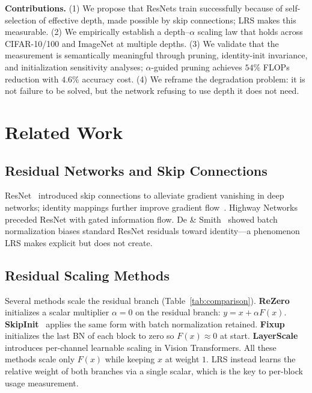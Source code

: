 \documentclass{bmvc2k}
\begin{document}
\textbf{Contributions.}
(1) We propose that ResNets train successfully because of self-selection of effective depth, made possible by skip connections; LRS makes this measurable.
(2) We empirically establish a depth--$\alpha$ scaling law that holds across CIFAR-10/100 and ImageNet at multiple depths.
(3) We validate that the measurement is semantically meaningful through pruning, identity-init invariance, and initialization sensitivity analyses; $\alpha$-guided pruning achieves $54\%$ FLOPs reduction with $4.6\%$ accuracy cost.
(4) We reframe the degradation problem: it is not failure to be solved, but the network refusing to use depth it does not need.

\section{Related Work}
\label{sec:related}

\subsection{Residual Networks and Skip Connections}

ResNet~\cite{he2016deep} introduced skip connections to alleviate gradient vanishing in deep networks; identity mappings further improve gradient flow~\cite{he2016identity}. Highway Networks~\cite{srivastava2015highway} preceded ResNet with gated information flow. De \& Smith~\cite{de2020batch} showed batch normalization biases standard ResNet residuals toward identity---a phenomenon LRS makes explicit but does not create.

\subsection{Residual Scaling Methods}

Several methods scale the residual branch (Table~\ref{tab:comparison}). \textbf{ReZero}~\cite{bachlechner2021rezero} initializes a scalar multiplier $\alpha = 0$ on the residual branch: $y = x + \alpha F(x)$. \textbf{SkipInit}~\cite{de2020batch} applies the same form with batch normalization retained. \textbf{Fixup}~\cite{zhang2019fixup} initializes the last BN of each block to zero so $F(x) \approx 0$ at start. \textbf{LayerScale}~\cite{touvron2021going} introduces per-channel learnable scaling in Vision Transformers. All these methods scale only $F(x)$ while keeping $x$ at weight $1$. LRS instead learns the relative weight of both branches via a single scalar, which is the key to per-block usage measurement.
\end{document}
